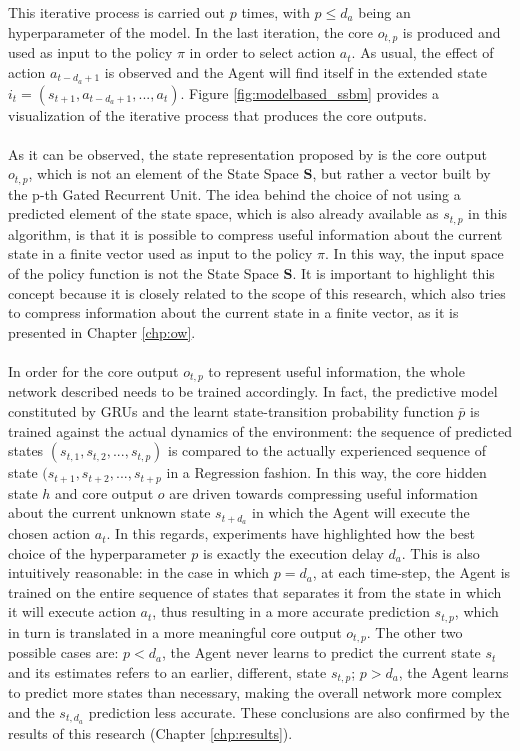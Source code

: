                 This iterative process is carried out $p$ times, with $p \leq d_a$ being an hyperparameter of the model. In the last iteration, the core $o_{t, p}$ is produced and used as input to the policy $\pi$ in order to select action $a_t$. As usual, the effect of action $a_{t-d_a+1}$ is observed and the Agent will find itself in the extended state $i_t = \left( s_{t+1}, a_{t-d_a+1},..., a_{t}\right)$. Figure \ref{fig:modelbased_ssbm} provides a visualization of the iterative process that produces the core outputs.
                \\\\
                As it can be observed, the state representation proposed by  is the core output $o_{t,p}$, which is not an element of the State Space $\mathbf{S}$, but rather a vector built by the p-th Gated Recurrent Unit. The idea behind the choice of not using a predicted element of the state space, which is also already available as $s_{t,p}$ in this algorithm, is that it is possible to compress useful information about the current state in a finite vector used as input to the policy $\pi$. In this way, the input space of the policy function is not the State Space $\mathbf{S}$. \newline
                It is important to highlight this concept because it is closely related to the scope of this research, which also tries to compress information about the current state in a finite vector, as it is presented in Chapter \ref{chp:ow}.
                \\\\
                In order for the core output $o_{t,p}$ to represent useful information, the whole network described needs to be trained accordingly. In fact, the predictive model constituted by GRUs and the learnt state-transition probability function $\bar{p}$ is trained against the actual dynamics of the environment: the sequence of predicted states $(s_{t, 1}, s_{t, 2}, ..., s_{t, p})$ is compared to the actually experienced sequence of state $(s_{t+1}, s_{t+2}, ..., s_{t+p}$ in a Regression fashion. In this way, the core hidden state $h$ and core output $o$ are driven towards compressing useful information about the current unknown state $s_{t+d_a}$ in which the Agent will execute the chosen action $a_t$. In this regards, experiments have highlighted how the best choice of the hyperparameter $p$ is exactly the execution delay $d_a$. This is also intuitively reasonable: in the case in which $p = d_a$, at each time-step, the Agent is trained on the entire sequence of states that separates it from the state in which it will execute action $a_t$, thus resulting in a more accurate prediction $s_{t, p}$, which in turn is translated in a more meaningful core output $o_{t, p}$. The other two possible cases are: $p < d_a$, the Agent never learns to predict the current state $s_t$ and its estimates refers to an earlier, different, state $s_{t,p}$; $p > d_a$, the Agent learns to predict more states than necessary, making the overall network more complex and the $s_{t, d_a}$ prediction less accurate. These conclusions are also confirmed by the results of this research (Chapter \ref{chp:results}).
                

